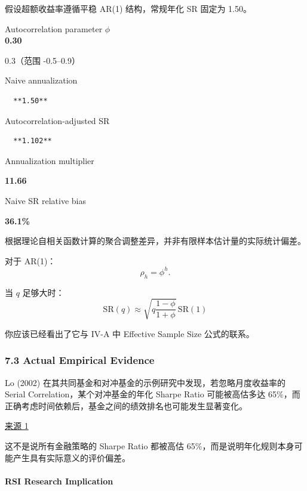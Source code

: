 假设超额收益率遵循平稳 AR(1) 结构，常规年化 SR 固定为 1.50。

Autocorrelation parameter \(\phi\)\\
\textbf{0.30}

0.3（范围 -0.5--0.9）

Naive annualization

\begin{verbatim}
  **1.50**
\end{verbatim}

Autocorrelation-adjusted SR

\begin{verbatim}
  **1.102**
\end{verbatim}

Annualization multiplier

\textbf{11.66}

Naive SR relative bias

\textbf{36.1\%}

根据理论自相关函数计算的聚合调整差异，并非有限样本估计量的实际统计偏差。

对于 AR(1)：
\[\rho_h=\phi^h.\]

当 \(q\) 足够大时：
\[\boxed{
\mathrm{SR}(q)
\approx
\sqrt{
q\frac{1-\phi}{1+\phi}
}\,\mathrm{SR}(1)
}\]

你应该已经看出了它与 IV-A 中 Effective Sample Size 公式的联系。

\hypertarget{part-4-67-0001-actual-empirical-evidence}{%
\subsubsection{7.3 Actual Empirical Evidence}\label{part-4-67-0001-actual-empirical-evidence}}

Lo (2002) 在其共同基金和对冲基金的示例研究中发现，若忽略月度收益率的 Serial Correlation，某个对冲基金的年化 Sharpe Ratio 可能被高估多达 65\%，而正确考虑时间依赖后，基金之间的绩效排名也可能发生显著变化。

\href{https://rpc.cfainstitute.org/research/financial-analysts-journal/2002/the-statistics-of-sharpe-ratios}{来源 1}

这不是说所有金融策略的 Sharpe Ratio 都被高估 65\%，而是说明年化规则本身可能产生具有实际意义的评价偏差。

\hypertarget{part-4-67-0001-rsi-research-implication}{%
\paragraph{RSI Research Implication}\label{part-4-67-0001-rsi-research-implication}}

